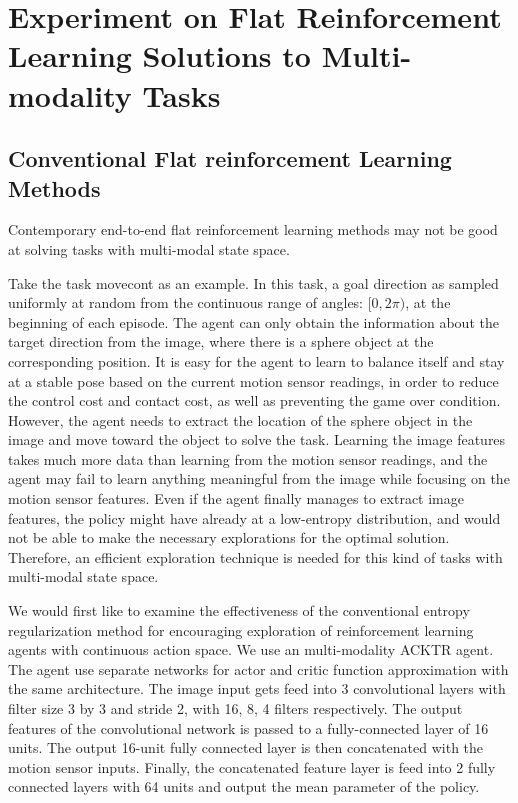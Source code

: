 
\section{Experiment on Flat Reinforcement Learning Solutions to Multi-modality Tasks}
\subsection{Conventional Flat reinforcement Learning Methods}\label{sec_multi_modal_flat}
Contemporary end-to-end flat reinforcement learning methods may not be good at solving tasks with multi-modal state space. 

Take the task movecont as an example. In this task, a goal direction as sampled uniformly at random from the continuous range of angles: $[0,2\pi)$, at the beginning of each episode. The agent can only obtain the information about the target direction from the image, where there is a sphere object at the corresponding position. It is easy for the agent to learn to balance itself and stay at a stable pose based on the current motion sensor readings, in order to reduce the control cost and contact cost, as well as preventing the game over condition. However, the agent needs to extract the location of the sphere object in the image and move toward the object to solve the task. Learning the image features takes much more data than learning from the motion sensor readings, and the agent may fail to learn anything meaningful from the image while focusing on the motion sensor features. Even if the agent finally manages to extract image features, the policy might have already at a low-entropy distribution, and would not be able to make the necessary explorations for the optimal solution. Therefore, an efficient exploration technique is needed for this kind of tasks with multi-modal state space.

We would first like to examine the effectiveness of the conventional entropy regularization method for encouraging exploration of reinforcement learning agents with continuous action space. We use an multi-modality ACKTR agent. The agent use separate networks for actor and critic function approximation with the same architecture. The image input gets feed into 3 convolutional layers with filter size 3 by 3 and stride 2, with 16, 8, 4 filters respectively. The output features of the convolutional network is passed to a fully-connected layer of 16 units. The output 16-unit fully connected layer is then concatenated with the motion sensor inputs. Finally, the concatenated feature layer is feed into 2 fully connected layers with 64 units and output the mean parameter of the policy. 

